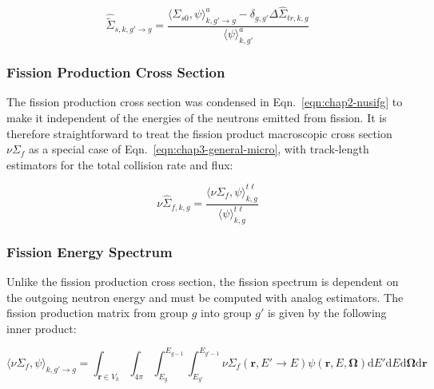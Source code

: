 \begin{equation}
\label{eqn:chap3-scatter-trans-macro}
\hat{\tilde{\Sigma}}_{s,k,g'\rightarrow g} = \frac{\langle \Sigma_{s0}, \psi \rangle_{k,g'\rightarrow g}^{a} - \delta_{g,g'} \Delta\hat{\Sigma}_{tr,k,g}}{\langle \psi \rangle_{k,g'}^{a}}
\end{equation}



\subsubsection{Fission Production Cross Section}
\label{subsubsec:chap3-tally-types-fiss-prod}

The fission production cross section was condensed in Eqn.~\ref{eqn:chap2-nusifg} to make it independent of the energies of the neutrons emitted from fission. It is therefore straightforward to treat the fission product macroscopic cross section $\nu\Sigma_{f}$ as a special case of Eqn.~\ref{eqn:chap3-general-micro}, with track-length estimators for the total collision rate and flux:

\begin{equation}
\label{eqn:chap3-nu-fiss-macro}
\nu\hat{\Sigma}_{f,k,g} = \frac{\langle \nu\Sigma_{f}, \psi \rangle_{k,g}^{t\ell}}{\langle \psi \rangle_{k,g}^{t\ell}}
\end{equation}


\subsubsection{Fission Energy Spectrum}
\label{subsubsec:chap3-tally-types-chi}

Unlike the fission production cross section, the fission spectrum is dependent on the outgoing neutron energy and must be computed with analog estimators. The fission production matrix from group $g$ into group $g'$ is given by the following inner product:

\begin{equation}
\label{eqn:chap3-nu-fiss-energies}
\langle \nu\Sigma_{f}, \psi \rangle_{k,g'\rightarrow g} = \int_{\mathbf{r} \in V_{k}} \int_{4\pi} \int_{E_{g}}^{E_{g-1}} \int_{E_{g'}}^{E_{g'-1}} \nu\Sigma_{f}(\mathbf{r},E'\rightarrow E)\psi(\mathbf{r},E,\mathbf{\Omega}) \mathrm{d}E'\mathrm{d}E\mathrm{d}\mathbf{\Omega}\mathrm{d}\mathbf{r}
\end{equation}


